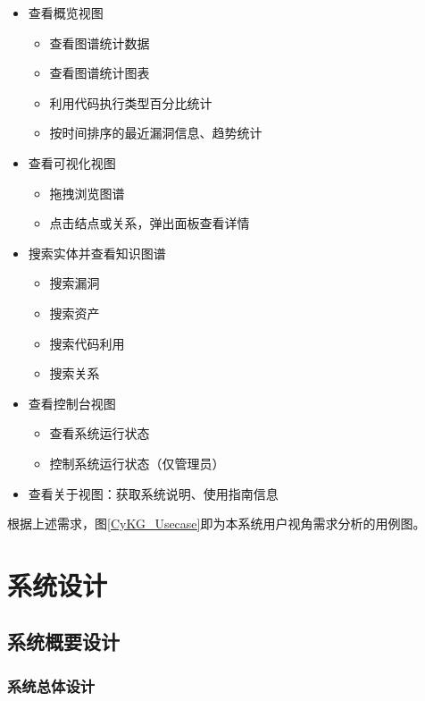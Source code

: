 \documentclass[a4paper,AutoFakeBold,oneside,12pt]{book}
\begin{document}
\begin{itemize}
	\item 查看概览视图
	      \begin{itemize}
		      \item 查看图谱统计数据
		      \item 查看图谱统计图表
		      \item 利用代码执行类型百分比统计
		      \item 按时间排序的最近漏洞信息、趋势统计
	      \end{itemize}
	\item 查看可视化视图
	      \begin{itemize}
		      \item 拖拽浏览图谱
		      \item 点击结点或关系，弹出面板查看详情
	      \end{itemize}
	\item 搜索实体并查看知识图谱
	      \begin{itemize}
		      \item 搜索漏洞
		      \item 搜索资产
		      \item 搜索代码利用
		      \item 搜索关系
	      \end{itemize}
	\item 查看控制台视图
	      \begin{itemize}
		      \item 查看系统运行状态
		      \item 控制系统运行状态（仅管理员）
	      \end{itemize}
	\item 查看关于视图：获取系统说明、使用指南信息
\end{itemize}

根据上述需求，图\ref{CyKG_Usecase}即为本系统用户视角需求分析的用例图。


\chapter{系统设计}

\section{系统概要设计}

\subsection{系统总体设计}
\end{document}
